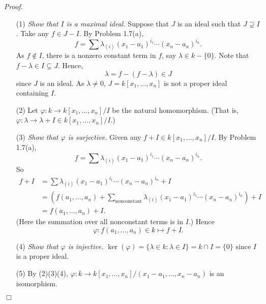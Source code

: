 \documentclass{article}
\begin{document}
\emph{Proof.}
\begin{enumerate}
\item[(1)]
  \emph{Show that $I$ is a maximal ideal.}
  Suppose that $J$ is an ideal such that $J \supsetneq I$.
  Take any $f \in J - I$.
  By Problem 1.7(a),
  \[
    f = \sum \lambda_{(i)} (x_1-a_1)^{i_1} \cdots (x_n - a_n)^{i_n}.
  \]
  As $f \not\in I$, there is a nonzero constant term in $f$, say $\lambda \in k - \{0\}$.
  Note that $f - \lambda \in I \subsetneq J$.
  Hence,
  \[
    \lambda = f - (f - \lambda) \in J
  \]
  since $J$ is an ideal.
  As $\lambda \neq 0$, $J = k[x_1,\ldots,x_n]$ is not a proper ideal containing $I$.

\item[(2)]
  Let $\varphi: k \to k[x_1,\ldots,x_n]/I$ be the natural homomorphism.
  (That is, $\varphi: \lambda \to \lambda + I \in k[x_1,\ldots,x_n]/I$.)

\item[(3)]
  \emph{Show that $\varphi$ is surjective.}
  Given any $f + I \in k[x_1,\ldots,x_n]/I$.
  By Problem 1.7(a),
  \[
    f = \sum \lambda_{(i)} (x_1-a_1)^{i_1} \cdots (x_n - a_n)^{i_n}.
  \]
  So
  \begin{align*}
    f + I
    &= \sum \lambda_{(i)} (x_1-a_1)^{i_1} \cdots (x_n - a_n)^{i_n} + I \\
    &= \left(f(a_1,\ldots,a_n)
      + \sum_{\text{nonconstant}} \lambda_{(i)} (x_1-a_1)^{i_1} \cdots (x_n - a_n)^{i_n} \right) + I \\
    &= f(a_1,\ldots,a_n) + I.
  \end{align*}
  (Here the summation over all nonconstant terms is in $I$.)
  Hence
  \[
    \varphi: f(a_1,\ldots,a_n) \in k \mapsto f + I.
  \]

\item[(4)]
  \emph{Show that $\varphi$ is injective.}
  $\ker(\varphi) = \{ \lambda \in k : \lambda \in I \} = k \cap I = \{0\}$
  since $I$ is a proper ideal.

\item[(5)]
  By (2)(3)(4), $\varphi: k \to k[x_1,\ldots,x_n]/(x_1-a_1,\ldots,x_n-a_n)$
  is an isomorphism.
\end{enumerate}
$\Box$ \\\\



\end{document}
